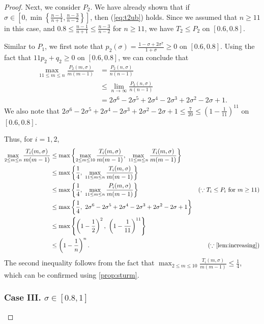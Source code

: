 \documentclass{article}
\theoremstyle{plain}
\theoremstyle{definition}
\theoremstyle{remark}
\def\bigopen#1{\left(#1\right)}
\def\bigset#1{\left\{#1\right\}}
\def\bigclosed#1{\left[#1\right]}
\begin{document}
\begin{proof}
Next, we consider $P_2$. We have already shown that if $\sigma \in \bigclosed{0, \min\bigset{\frac{n-1}{n+1}, \frac{n-3}{n-2}}}$, then (\ref{eq:t2ub}) holds. Since we assumed that $n \ge 11$ in this case, and $0.8 \le \frac{n-1}{n+1} \le \frac{n-3}{n-2}$ for $n \ge 11$, we have $T_2\le P_2$ on $[0.6, 0.8]$.

Similar to $P_1$, we first note that $p_2(\sigma) = \frac{1-\sigma+2\sigma^7}{1+\sigma} \ge 0$ on $[0.6, 0.8]$. Using the fact that $11p_2+q_2 \ge 0$ on $[0.6, 0.8]$, we can conclude that 
\begin{align*}
    \max_{11 \le m \le n} \frac{P_2(m, \sigma)}{m(m-1)} &= \frac{P_2(n, \sigma)}{n(n-1)} \\
    &\le \lim_{n\to \infty} \frac{P_2(n, \sigma)}{n(n-1)} \\
    &= 2 \sigma^6 - 2 \sigma^5 + 2 \sigma^4 - 2 \sigma^3 + 2 \sigma^2 - 2 \sigma + 1.
\end{align*}
We also note that $2 \sigma^6 - 2 \sigma^5 + 2 \sigma^4 - 2 \sigma^3 + 2 \sigma^2 - 2 \sigma + 1 \le \frac{7}{20} \le \bigopen{1-\frac{1}{11}}^{11}$ on $[0.6, 0.8]$.

Thus, for $i=1,2$,
\begin{align*}
    \max_{2\le m\le n} \frac{T_i(m, \sigma)}{m(m-1)} &\le \max \bigset{\max_{2\le m\le 10} \frac{T_i(m, \sigma)}{m(m-1)},~\max_{11\le m\le n} \frac{T_i(m, \sigma)}{m(m-1)}} \\
    &\le \max \bigset{\frac{1}{4},~\max_{11\le m\le n} \frac{T_i(m, \sigma)}{m(m-1)}} \\
    &\le \max \bigset{\frac{1}{4},~\max_{11\le m\le n} \frac{P_i(m, \sigma)}{m(m-1)}} &(\because T_i\le P_i \text{ for } m\ge 11) \\
    &\le \max \bigset{\frac{1}{4},~2 \sigma^6 - 2 \sigma^5 + 2 \sigma^4 - 2 \sigma^3 + 2 \sigma^2 - 2 \sigma + 1} \\
    &\le \max \bigset{\bigopen{1-\frac{1}{2}}^2,~\bigopen{1-\frac{1}{11}}^{11}} \\
    &\le \bigopen{1-\frac{1}{n}}^{n}. &(\because \text{\cref{lem:increasing}})
\end{align*}
The second inequality follows from the fact that $\max_{2\le m\le 10} \frac{T_i(m, \sigma)}{m(m-1)} \le \frac{1}{4}$, which can be confirmed using \cref{prop:sturm}.

\subsubsection*{Case III. $\sigma \in [0.8, 1]$}


\end{proof}
\end{document}
